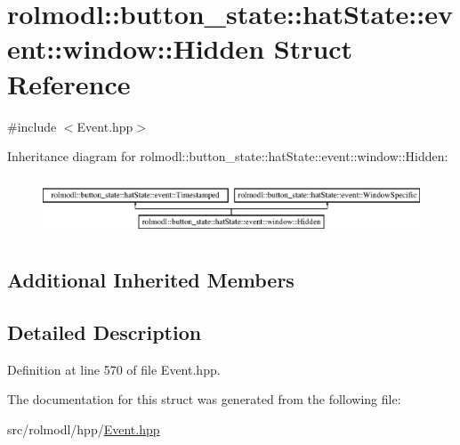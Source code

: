 \hypertarget{structrolmodl_1_1button__state_1_1hat_state_1_1event_1_1window_1_1_hidden}{}\section{rolmodl\+::button\+\_\+state\+::hat\+State\+::event\+::window\+::Hidden Struct Reference}
\label{structrolmodl_1_1button__state_1_1hat_state_1_1event_1_1window_1_1_hidden}


{\ttfamily \#include $<$Event.\+hpp$>$}

Inheritance diagram for rolmodl\+::button\+\_\+state\+::hat\+State\+::event\+::window\+::Hidden\+:\begin{figure}[H]
\begin{center}
\leavevmode
\includegraphics[height=1.761006cm]{structrolmodl_1_1button__state_1_1hat_state_1_1event_1_1window_1_1_hidden}
\end{center}
\end{figure}
\subsection*{Additional Inherited Members}


\subsection{Detailed Description}


Definition at line 570 of file Event.\+hpp.



The documentation for this struct was generated from the following file\+:\begin{DoxyCompactItemize}
\item 
src/rolmodl/hpp/\mbox{\hyperlink{_event_8hpp}{Event.\+hpp}}\end{DoxyCompactItemize}
